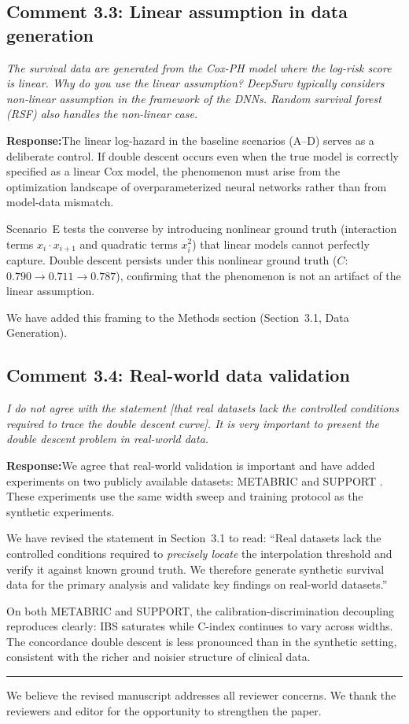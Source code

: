 \documentclass[12pt,a4paper]{article}
\newcommand{\comment}[1]{%
  \begin{reviewerbox}
    \textit{#1}
  \end{reviewerbox}
}
\newcommand{\response}{\noindent\textbf{Response:}\quad}
\begin{document}
\bigskip

\subsection*{Comment 3.3: Linear assumption in data generation}

\comment{The survival data are generated from the Cox-PH model where the log-risk score is linear. Why do you use the linear assumption? DeepSurv typically considers non-linear assumption in the framework of the DNNs. Random survival forest (RSF) also handles the non-linear case.}

\response The linear log-hazard in the baseline scenarios (A--D) serves as a
deliberate control. If double descent occurs even when the true model is
correctly specified as a linear Cox model, the phenomenon must arise from the
optimization landscape of overparameterized neural networks rather than from
model-data mismatch.

Scenario~E tests the converse by introducing nonlinear ground truth
(interaction terms $x_i \cdot x_{i+1}$ and quadratic terms $x_i^2$) that
linear models cannot perfectly capture. Double descent persists under this
nonlinear ground truth ($C$: $0.790 \to 0.711 \to 0.787$), confirming that
the phenomenon is not an artifact of the linear assumption.

We have added this framing to the Methods section (Section~3.1, Data
Generation).


\bigskip

\subsection*{Comment 3.4: Real-world data validation}

\comment{I do not agree with the statement [that real datasets lack the controlled conditions required to trace the double descent curve]. It is very important to present the double descent problem in real-world data.}

\response We agree that real-world validation is important and have added
experiments on two publicly available datasets: METABRIC
\citep{curtis2012genomic} and SUPPORT \citep{knaus1995support}. These
experiments use the same width sweep and training protocol as the synthetic
experiments.

We have revised the statement in Section~3.1 to read: ``Real datasets lack
the controlled conditions required to \emph{precisely locate} the
interpolation threshold and verify it against known ground truth. We
therefore generate synthetic survival data for the primary analysis and
validate key findings on real-world datasets.''

On both METABRIC and SUPPORT, the calibration-discrimination decoupling
reproduces clearly: IBS saturates while C-index continues to vary across
widths. The concordance double descent is less pronounced than in the
synthetic setting, consistent with the richer and noisier structure of
clinical data.


\bigskip
\hrule
\bigskip

\noindent We believe the revised manuscript addresses all reviewer concerns.
We thank the reviewers and editor for the opportunity to strengthen the
paper.
\end{document}
